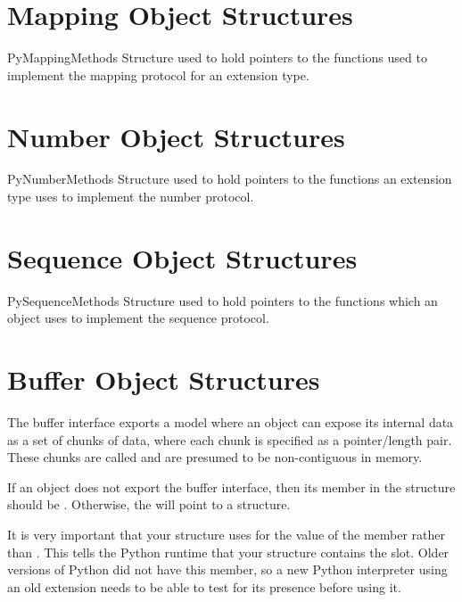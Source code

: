 \documentclass{manual}
\begin{document}
\section{Mapping Object Structures \label{mapping-structs}}

\begin{ctypedesc}{PyMappingMethods}
Structure used to hold pointers to the functions used to implement the 
mapping protocol for an extension type.
\end{ctypedesc}


\section{Number Object Structures \label{number-structs}}

\begin{ctypedesc}{PyNumberMethods}
Structure used to hold pointers to the functions an extension type
uses to implement the number protocol.
\end{ctypedesc}


\section{Sequence Object Structures \label{sequence-structs}}

\begin{ctypedesc}{PySequenceMethods}
Structure used to hold pointers to the functions which an object uses
to implement the sequence protocol.
\end{ctypedesc}


\section{Buffer Object Structures \label{buffer-structs}}

The buffer interface exports a model where an object can expose its
internal data as a set of chunks of data, where each chunk is
specified as a pointer/length pair.  These chunks are called
 and are presumed to be non-contiguous in memory.

If an object does not export the buffer interface, then its
 member in the  structure
should be \NULL{}.  Otherwise, the  will point to
a  structure.

 It is very important that your
 structure uses  for
the value of the  member rather than .  This
tells the Python runtime that your  structure
contains the  slot. Older versions of Python
did not have this member, so a new Python interpreter using an old
extension needs to be able to test for its presence before using it.
\end{document}
